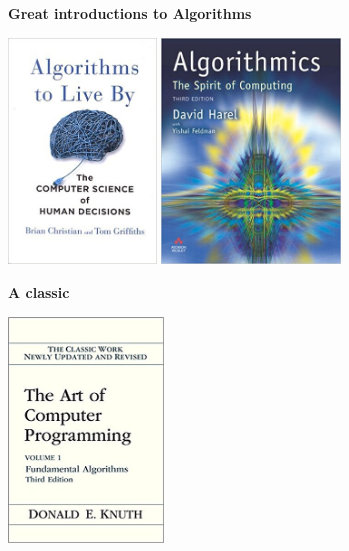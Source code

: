 \begin{frame}
{\bf Great introductions to Algorithms}

\includegraphics[height=6cm]{Figures/AlgsToLiveBy.jpg}
\includegraphics[height=6cm]{Figures/AlgsSpririt.jpg}
\end{frame}

\begin{frame}
{\bf A classic}

\includegraphics[height=6cm]{Figures/theart.jpg}
\end{frame}

